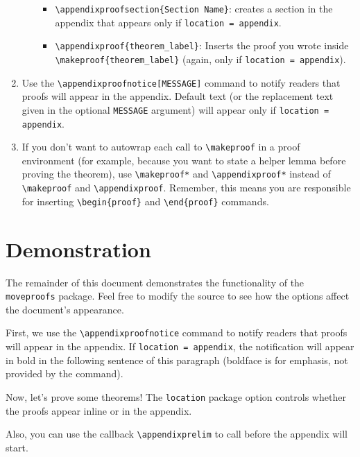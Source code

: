 \documentclass{article}
\begin{document}
\begin{enumerate}
\begin{itemize}
            \begin{itemize}
            \item \texttt{\textbackslash appendixproofsection\{Section Name\}}: creates a section in the appendix that appears only if \texttt{location = appendix}.
            \item \texttt{\textbackslash appendixproof\{theorem\_label\}}: Inserts the proof you wrote inside \texttt{\textbackslash makeproof\{theorem\_label\}} (again, only if \texttt{location = appendix}).
            \end{itemize}
        \end{itemize}
    \item Use the \texttt{\textbackslash appendixproofnotice[MESSAGE]} command to notify readers that proofs will appear in the appendix. Default text (or the replacement text given in the optional \texttt{MESSAGE} argument) will appear only if \texttt{location = appendix}.
    \item If you don't want to autowrap each call to \texttt{\textbackslash makeproof} in a proof environment (for example, because you want to state a helper lemma before proving the theorem), use \texttt{\textbackslash makeproof*} and \texttt{\textbackslash appendixproof*} instead of \texttt{\textbackslash makeproof} and \texttt{\textbackslash appendixproof}. Remember, this means you are responsible for inserting \texttt{\textbackslash begin\{proof\}} and \texttt{\textbackslash end\{proof\}} commands.
\end{enumerate}

\section{Demonstration}
The remainder of this document demonstrates the functionality of the \texttt{moveproofs} package.
Feel free to modify the source to see how the options affect the document's appearance.

First, we use the \texttt{\textbackslash appendixproofnotice} command to notify readers that proofs will appear in the appendix. If \texttt{location = appendix}, the notification will appear in bold in the following sentence of this paragraph (boldface is for emphasis, not provided by the command). \textbf{}

Now, let's prove some theorems! The \texttt{location} package option controls whether the proofs appear inline or in the appendix.

Also, you can use the callback \texttt{\textbackslash appendixprelim} to call before the appendix will start.
\end{document}
